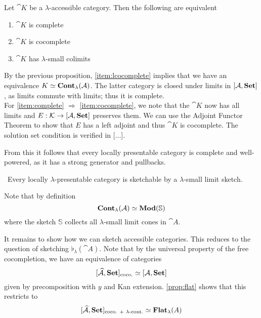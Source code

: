 \begin{Corollary}
Let $\cat K$ be a $\lambda$-accessible category. Then the following are equivalent
\begin{enumerate}
\item $\cat K$ is complete \label{item:complete}
\item $\cat K$ is cocomplete \label{item:cocomplete}
\item $\cat K$ has $\lambda$-small colimits \label{item:lcocomplete}
\end{enumerate}
\end{Corollary}
\begin{Proof}
By the previous proposition, \ref{item:lcocomplete} implies that we have an equivalence $K \simeq \mathbf{Cont}_\lambda(\mathcal{A})$. The latter category is closed under limits in $[\mathcal{A},\mathbf{Set}]$, as limits commute with limits; thus it is complete. \\

For \ref{item:complete} $\Rightarrow$ \ref{item:cocomplete}, we note that the $\cat K$ now has all limits and $E : \mathcal{K} \to [\mathcal{A},\mathbf{Set}]$ preserves them. We can use the Adjoint Functor Theorem to show that $E$ has a left adjoint and thus $\cat K$ is cocomplete. The solution set condition is verified in [...].
\end{Proof}

From this it follows that every locally presentable category is complete and well-powered, as it has a strong generator and pullbacks.

\begin{Corollary}\
Every locally $\lambda$-presentable category is sketchable by a $\lambda$-small limit sketch.
\end{Corollary}
\begin{Proof}
Note that by definition
\[ \mathbf{Cont}_\lambda(\mathcal{A}) \simeq \mathbf{Mod}(\mathbb S) \]
where the sketch $\mathbb S$ collects all $\lambda$-small limit cones in $\cat A$.
\end{Proof}

It remains to show how we can sketch accessible categories. This reduces to the question of sketching $\flat_\lambda(\cat A)$. Note that by the universal property of the free cocompletion, we have an equivalence of categories
\[ [\widehat{\mathcal{A}},\mathbf{Set}]_{\text{coco.}} \simeq [\mathcal{A},\mathbf{Set}] \]
given by precomposition with $y$ and Kan extension. \ref{prop:flat} shows that this restricts to
\[ [\widehat{\mathcal{A}},\mathbf{Set}]_{\text{coco. + $\lambda$-cont.}} \simeq \mathbf{Flat}_\lambda(A) \]